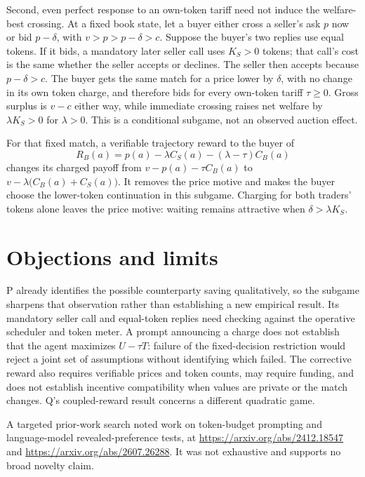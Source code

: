 \documentclass{article}
\begin{document}
Second, even perfect response to an own-token tariff need not induce the welfare-best crossing. At a fixed book state, let a buyer either cross a seller's ask \(p\) now or bid \(p-\delta\), with \(v>p>p-\delta>c\). Suppose the buyer's two replies use equal tokens. If it bids, a mandatory later seller call uses \(K_S>0\) tokens; that call's cost is the same whether the seller accepts or declines. The seller then accepts because \(p-\delta>c\). The buyer gets the same match for a price lower by \(\delta\), with no change in its own token charge, and therefore bids for every own-token tariff \(\tau\geq0\). Gross surplus is \(v-c\) either way, while immediate crossing raises net welfare by \(\lambda K_S>0\) for \(\lambda>0\). This is a conditional subgame, not an observed auction effect. 

For that fixed match, a verifiable trajectory reward to the buyer of
\[
R_B(a)=p(a)-\lambda C_S(a)-(\lambda-\tau)C_B(a)
\]
changes its charged payoff from \(v-p(a)-\tau C_B(a)\) to \(v-\lambda\bigl(C_B(a)+C_S(a)\bigr)\). It removes the price motive and makes the buyer choose the lower-token continuation in this subgame. Charging for both traders' tokens alone leaves the price motive: waiting remains attractive when \(\delta>\lambda K_S\). 

\section*{Objections and limits}

P already identifies the possible counterparty saving qualitatively, so the subgame sharpens that observation rather than establishing a new empirical result. Its mandatory seller call and equal-token replies need checking against the operative scheduler and token meter. A prompt announcing a charge does not establish that the agent maximizes \(U-\tau T\): failure of the fixed-decision restriction would reject a joint set of assumptions without identifying which failed. The corrective reward also requires verifiable prices and token counts, may require funding, and does not establish incentive compatibility when values are private or the match changes. Q's coupled-reward result concerns a different quadratic game. 

A targeted prior-work search noted work on token-budget prompting and language-model revealed-preference tests, at \url{https://arxiv.org/abs/2412.18547} and \url{https://arxiv.org/abs/2607.26288}. It was not exhaustive and supports no broad novelty claim. 
\end{document}
